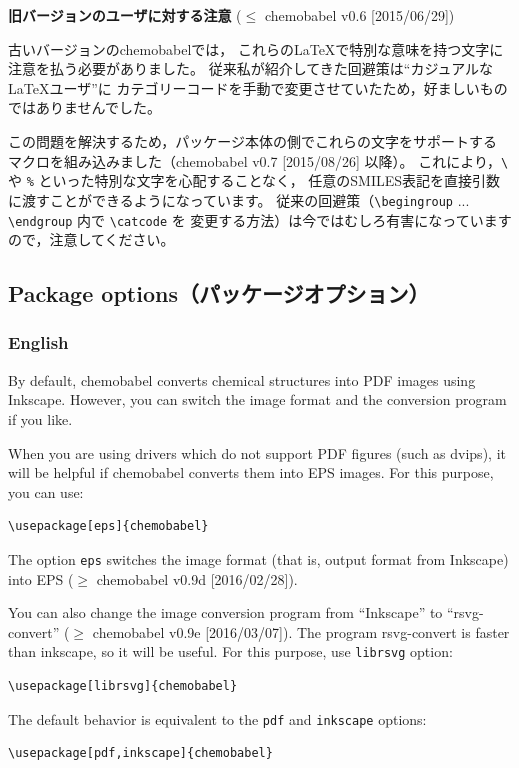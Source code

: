 \documentclass[12pt]{ltjsarticle}
\begin{document}
\noindent \textbf{旧バージョンのユーザに対する注意} ($\le$ \textsf{chemobabel} v0.6 [2015/06/29])

古いバージョンの\textsf{chemobabel}では，
これらの\LaTeX で特別な意味を持つ文字に注意を払う必要がありました。
従来私が紹介してきた回避策は“カジュアルな \LaTeX ユーザ”に
カテゴリーコードを手動で変更させていたため，好ましいものではありませんでした。

この問題を解決するため，パッケージ本体の側でこれらの文字をサポートする
マクロを組み込みました（\textsf{chemobabel} v0.7 [2015/08/26] 以降）。
これにより，\verb|\| や \verb|%| といった特別な文字を心配することなく，
任意のSMILES表記を直接引数に渡すことができるようになっています。
従来の回避策（\verb|\begingroup| ... \verb|\endgroup| 内で \verb|\catcode| を
変更する方法）は今ではむしろ有害になっていますので，注意してください。

\clearpage

\subsection{Package options（パッケージオプション）}

\subsubsection{English}

By default, \textsf{chemobabel} converts chemical structures into
PDF images using Inkscape. However, you can switch the image format
and the conversion program if you like.

When you are using drivers which do not support PDF figures (such as dvips),
it will be helpful if \textsf{chemobabel} converts them into EPS images.
For this purpose, you can use:
\begin{verbatim}
\usepackage[eps]{chemobabel}
\end{verbatim}
The option \verb|eps| switches the image format (that is, output format
from Inkscape) into EPS ($\ge$ \textsf{chemobabel} v0.9d [2016/02/28]).

You can also change the image conversion program from ``Inkscape'' to
``rsvg-convert'' ($\ge$ \textsf{chemobabel} v0.9e [2016/03/07]).
The program rsvg-convert is faster than inkscape, so it will be useful.
For this purpose, use \verb|librsvg| option:
\begin{verbatim}
\usepackage[librsvg]{chemobabel}
\end{verbatim}

The default behavior is equivalent to the \verb|pdf| and \verb|inkscape| options:
\begin{verbatim}
\usepackage[pdf,inkscape]{chemobabel}
\end{verbatim}
\end{document}
